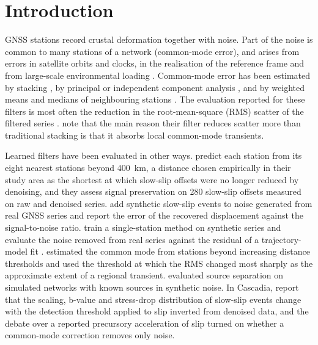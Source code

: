 \documentclass[preprint,12pt,authoryear]{elsarticle}
\begin{document}
\section{Introduction}
\label{sec:intro}

GNSS stations record crustal deformation together with noise. Part of the noise is common to many stations of a network (common-mode error), and arises from errors in satellite orbits and clocks, in the realisation of the reference frame and from large-scale environmental loading \citep{wdowinski1997, dong2006, kreemer2021}. Common-mode error has been estimated by stacking \citep{wdowinski1997}, by principal or independent component analysis \citep{dong2006, gruszczynski2018, zhou2022}, and by weighted means and medians of neighbouring stations \citep{tianshen2016, kreemer2021}. The evaluation reported for these filters is most often the reduction in the root-mean-square (RMS) scatter of the filtered series \citep{tianshen2016, kreemer2021, zhou2022}. \citet{kreemer2021} note that the main reason their filter reduces scatter more than traditional stacking is that it absorbs local common-mode transients.

Learned filters have been evaluated in other ways. \citet{bachelot2025} predict each station from its eight nearest stations beyond 400~km, a distance chosen empirically in their study area as the shortest at which slow-slip offsets were no longer reduced by denoising, and they assess signal preservation on 280 slow-slip offsets measured on raw and denoised series. \citet{costantino2024} add synthetic slow-slip events to noise generated from real GNSS series and report the error of the recovered displacement against the signal-to-noise ratio. \citet{mastella2025} train a single-station method on synthetic series and evaluate the noise removed from real series against the residual of a trajectory-model fit \citep{bedfordbevis2018}. \citet{tianshen2016} estimated the common mode from stations beyond increasing distance thresholds and used the threshold at which the RMS changed most sharply as the approximate extent of a regional transient. \citet{gualandi2016} evaluated source separation on simulated networks with known sources in synthetic noise. In Cascadia, \citet{costantino2026} report that the scaling, b-value and stress-drop distribution of slow-slip events change with the detection threshold applied to slip inverted from denoised data, and the debate over a reported precursory acceleration of slip \citep{bletery2023, bletery2025} turned on whether a common-mode correction removes only noise.
\end{document}
